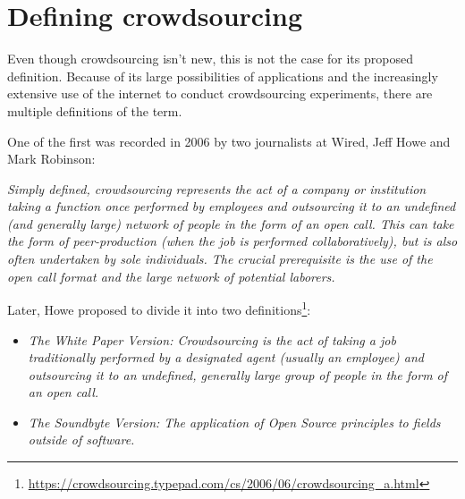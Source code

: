\section{Defining crowdsourcing}
\label{sub:definition-crowdsourcing}

Even though crowdsourcing isn't new, this is not the case for its proposed definition.
Because of its large possibilities of applications and the increasingly extensive use of the internet to conduct crowdsourcing experiments, there are multiple definitions of the term.

One of the first was recorded in 2006 by two journalists at Wired, Jeff Howe and Mark Robinson:
\begin{center}
\begin{minipage}{.75\textwidth}
    \emph{Simply defined, crowdsourcing represents the act of a company or institution taking a function once performed by employees and outsourcing it to an undefined (and generally large) network of people in the form of an open call. This can take the form of peer-production (when the job is performed collaboratively), but is also often undertaken by sole individuals. The crucial prerequisite is the use of the open call format and the large network of potential laborers.}
\end{minipage}
\end{center}
Later, Howe proposed to divide it into two definitions\footnote{\url{https://crowdsourcing.typepad.com/cs/2006/06/crowdsourcing_a.html}}:
\begin{center}
\begin{minipage}{.75\textwidth}
\begin{itemize}
    \item \emph{The White Paper Version: Crowdsourcing is the act of taking a job traditionally performed by a designated agent (usually an employee) and outsourcing it to an undefined, generally large group of people in the form of an open call.
}
    \item \emph{The Soundbyte Version: The application of Open Source principles to fields outside of software.
}
\end{itemize}
\end{minipage}
\end{center}

